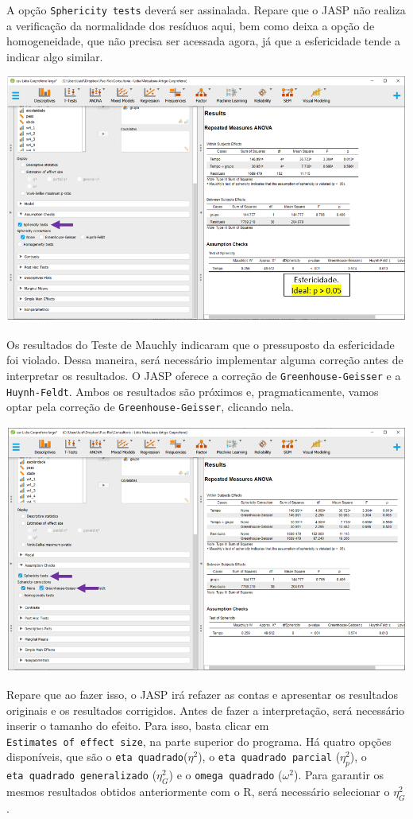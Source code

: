 \documentclass[
]{book}
\begin{document}
A opção \texttt{Sphericity\ tests} deverá ser assinalada. Repare que o JASP não realiza a verificação da normalidade dos resíduos aqui, bem como deixa a opção de homogeneidade, que não precisa ser acessada agora, já que a esfericidade tende a indicar algo similar.

\includegraphics{./img/cap_anovarm_esfericidade.png}

Os resultados do Teste de Mauchly indicaram que o pressuposto da esfericidade foi violado. Dessa maneira, será necessário implementar alguma correção antes de interpretar os resultados. O JASP oferece a correção de \texttt{Greenhouse-Geisser} e a \texttt{Huynh-Feldt}. Ambos os resultados são próximos e, pragmaticamente, vamos optar pela correção de \texttt{Greenhouse-Geisser}, clicando nela.

\includegraphics{./img/cap_anovarm_esfericidade2.png}

Repare que ao fazer isso, o JASP irá refazer as contas e apresentar os resultados originais e os resultados corrigidos. Antes de fazer a interpretação, será necessário inserir o tamanho do efeito. Para isso, basta clicar em \texttt{Estimates\ of\ effect\ size}, na parte superior do programa. Há quatro opções disponíveis, que são o \texttt{eta\ quadrado}(\(\eta^2\)), o \texttt{eta\ quadrado\ parcial} (\(\eta^2_p\)), o \texttt{eta\ quadrado\ generalizado} (\(\eta^2_G\)) e o \texttt{omega\ quadrado} (\(\omega^2\)). Para garantir os mesmos resultados obtidos anteriormente com o R, será necessário selecionar o \(\eta^2_G\).
\end{document}
